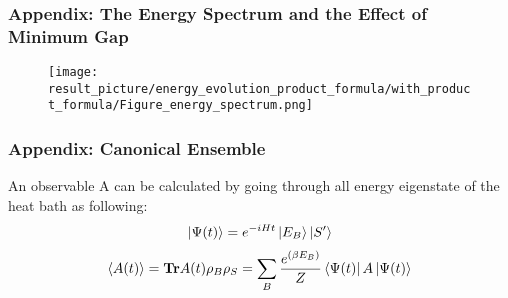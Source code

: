 \documentclass{beamer}
\begin{document}


\begin{frame}
	\frametitle{Appendix: The Energy Spectrum and the Effect of Minimum Gap}
	\begin{figure}
		\centering
		\texttt{[image: result\_picture/energy\_evolution\_product\_formula/with\_product\_formula/Figure\_energy\_spectrum.png]}
		
	\end{figure}
\end{frame}

\begin{frame}
	\frametitle{Appendix: Canonical Ensemble}
	An observable A can be calculated by going through all energy eigenstate of the heat bath as following:\\
	
	\begin{equation*}
	\begin{split}
	\label{psi_assemble_method}
	\ket{\Psi(t)}&=e^{-iHt} \ket{E_B}\ket{S'}\\
	\end{split}
	\end{equation*}
	\begin{equation*}
	\langle A(t)\rangle = \mathbf{Tr} A(t) \rho_B \rho_S= \sum_{B}\frac{e^{(\beta E_B)}}{Z}\bra{\Psi(t)}A\ket{\Psi(t)}
	\end{equation*}
	
\end{frame}
\end{document}
